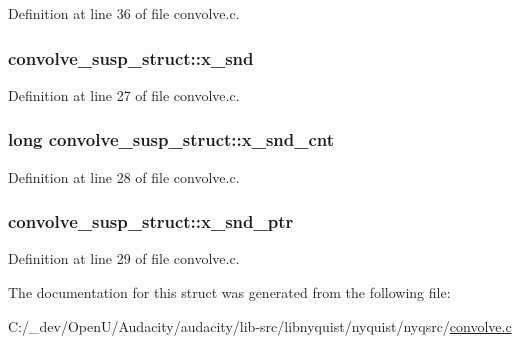 Definition at line 36 of file convolve.\+c.

\subsubsection[{\texorpdfstring{x\+\_\+snd}{x_snd}}]{ convolve\+\_\+susp\+\_\+struct\+::x\+\_\+snd}\hypertarget{structconvolve__susp__struct_a8970402564ecc828d57cb792197a1548}{}\label{structconvolve__susp__struct_a8970402564ecc828d57cb792197a1548}


Definition at line 27 of file convolve.\+c.

\subsubsection[{\texorpdfstring{x\+\_\+snd\+\_\+cnt}{x_snd_cnt}}]{\setlength{\rightskip}{0pt plus 5cm}long convolve\+\_\+susp\+\_\+struct\+::x\+\_\+snd\+\_\+cnt}\hypertarget{structconvolve__susp__struct_a80900e90aed5dac71c0f00afef272556}{}\label{structconvolve__susp__struct_a80900e90aed5dac71c0f00afef272556}


Definition at line 28 of file convolve.\+c.

\subsubsection[{\texorpdfstring{x\+\_\+snd\+\_\+ptr}{x_snd_ptr}}]{ convolve\+\_\+susp\+\_\+struct\+::x\+\_\+snd\+\_\+ptr}\hypertarget{structconvolve__susp__struct_aee4a9c8f32c4adef7cd2ff8b72e8f1d7}{}\label{structconvolve__susp__struct_aee4a9c8f32c4adef7cd2ff8b72e8f1d7}


Definition at line 29 of file convolve.\+c.



The documentation for this struct was generated from the following file\+:\begin{DoxyCompactItemize}
\item 
C\+:/\+\_\+dev/\+Open\+U/\+Audacity/audacity/lib-\/src/libnyquist/nyquist/nyqsrc/\hyperlink{convolve_8c}{convolve.\+c}\end{DoxyCompactItemize}

